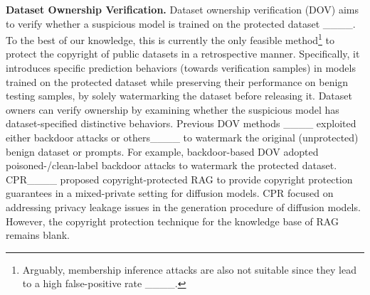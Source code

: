  




\noindent \textbf{Dataset Ownership Verification.} Dataset ownership verification (DOV) aims to verify whether a suspicious model is trained on the protected dataset ____. To the best of our knowledge, this is currently the only feasible method\footnote{Arguably, membership inference attacks are also not suitable since they lead to a high false-positive rate ____. } to protect the copyright of public datasets in a retrospective manner. Specifically, it introduces specific prediction behaviors (towards verification samples) in models trained on the protected dataset while preserving their performance on benign testing samples, by solely watermarking the dataset before releasing it. Dataset owners can verify ownership by examining whether the suspicious model has dataset-specified distinctive behaviors. Previous DOV methods ____ exploited either backdoor attacks or others____ to watermark the original (unprotected) benign dataset or prompts. For example, backdoor-based DOV adopted poisoned-/clean-label backdoor attacks to watermark the protected dataset. %
CPR____ proposed copyright-protected RAG to provide copyright protection guarantees in a mixed-private setting for diffusion models. CPR focused on addressing privacy leakage issues in the generation procedure of diffusion models. However, the copyright protection technique for the knowledge base of RAG remains blank.